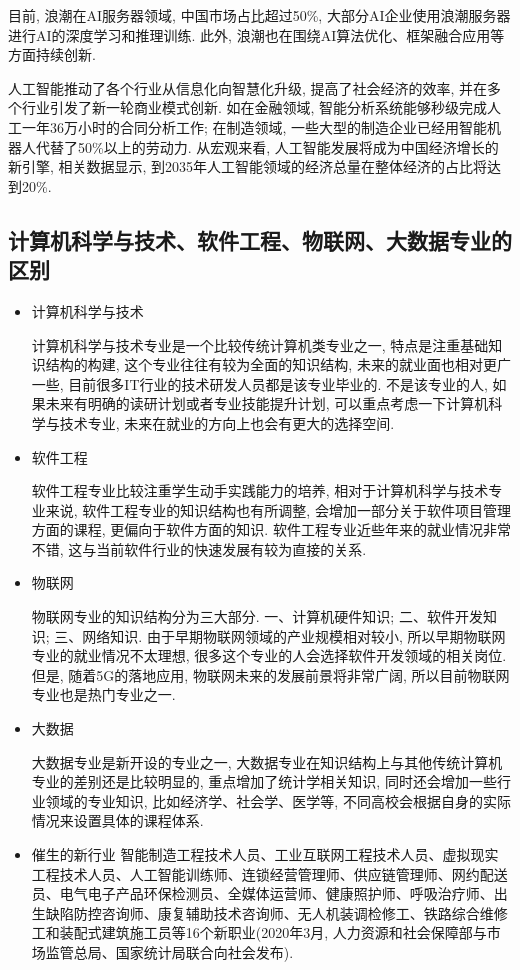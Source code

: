目前, 浪潮在AI服务器领域, 中国市场占比超过50\%, 大部分AI企业使用浪潮服务器进行AI的深度学习和推理训练. 此外, 浪潮也在围绕AI算法优化、框架融合应用等方面持续创新.

人工智能推动了各个行业从信息化向智慧化升级, 提高了社会经济的效率, 并在多个行业引发了新一轮商业模式创新. 如在金融领域, 智能分析系统能够秒级完成人工一年36万小时的合同分析工作; 在制造领域, 一些大型的制造企业已经用智能机器人代替了50\%以上的劳动力. 从宏观来看, 人工智能发展将成为中国经济增长的新引擎, 相关数据显示, 到2035年人工智能领域的经济总量在整体经济的占比将达到20\%.
\subsection{计算机科学与技术、软件工程、物联网、大数据专业的区别}
\begin{itemize}
\item 计算机科学与技术

计算机科学与技术专业是一个比较传统计算机类专业之一, 特点是注重基础知识结构的构建, 这个专业往往有较为全面的知识结构, 未来的就业面也相对更广一些, 目前很多IT行业的技术研发人员都是该专业毕业的.
不是该专业的人, 如果未来有明确的读研计划或者专业技能提升计划, 可以重点考虑一下计算机科学与技术专业, 未来在就业的方向上也会有更大的选择空间.

\item 软件工程

软件工程专业比较注重学生动手实践能力的培养, 相对于计算机科学与技术专业来说, 软件工程专业的知识结构也有所调整, 会增加一部分关于软件项目管理方面的课程, 更偏向于软件方面的知识.
软件工程专业近些年来的就业情况非常不错, 这与当前软件行业的快速发展有较为直接的关系.

\item 物联网

物联网专业的知识结构分为三大部分. 一、计算机硬件知识; 二、软件开发知识; 三、网络知识.
由于早期物联网领域的产业规模相对较小, 所以早期物联网专业的就业情况不太理想, 很多这个专业的人会选择软件开发领域的相关岗位.
但是, 随着5G的落地应用, 物联网未来的发展前景将非常广阔, 所以目前物联网专业也是热门专业之一.

\item 大数据

大数据专业是新开设的专业之一, 大数据专业在知识结构上与其他传统计算机专业的差别还是比较明显的, 重点增加了统计学相关知识, 同时还会增加一些行业领域的专业知识, 比如经济学、社会学、医学等, 不同高校会根据自身的实际情况来设置具体的课程体系.

\item 催生的新行业
智能制造工程技术人员、工业互联网工程技术人员、虚拟现实工程技术人员、人工智能训练师、连锁经营管理师、供应链管理师、网约配送员、电气电子产品环保检测员、全媒体运营师、健康照护师、呼吸治疗师、出生缺陷防控咨询师、康复辅助技术咨询师、无人机装调检修工、铁路综合维修工和装配式建筑施工员等16个新职业(2020年3月, 人力资源和社会保障部与市场监管总局、国家统计局联合向社会发布).
\end{itemize}
